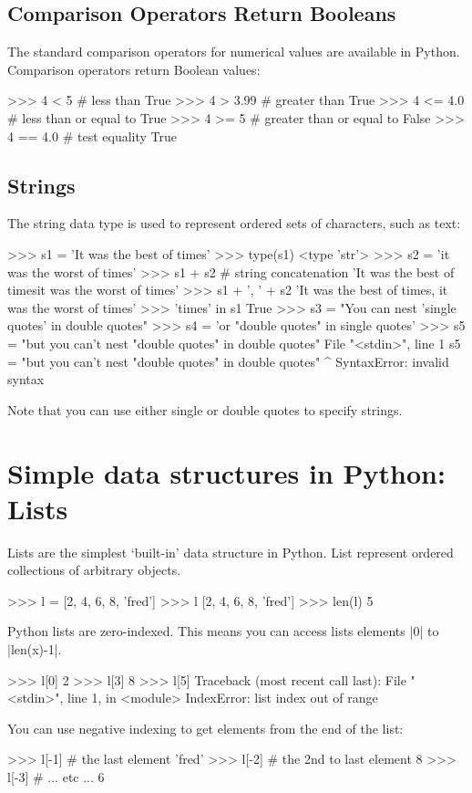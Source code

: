 \subsection{Comparison Operators Return Booleans}

The standard comparison operators for numerical values are available in Python. Comparison operators return Boolean values:
%
\begin{python}
>>> 4 < 5 # less than
True
>>> 4 > 3.99 # greater than
True
>>> 4 <= 4.0 # less than or equal to
True
>>> 4 >= 5 # greater than or equal to
False
>>> 4 == 4.0 # test equality
True
\end{python}


\subsection{Strings}
%
The string data type is used to represent ordered sets of characters, such as text:
%
\begin{python}
>>> s1 = 'It was the best of times'
>>> type(s1)
<type 'str'>
>>> s2 = 'it was the worst of times'
>>> s1 + s2  # string concatenation
'It was the best of timesit was the worst of times'
>>> s1 + ', ' + s2
'It was the best of times, it was the worst of times'
>>> 'times' in s1
True
>>> s3 = "You can nest 'single quotes' in double quotes"
>>> s4 = 'or "double quotes" in single quotes'
>>> s5 = "but you can't nest "double quotes" in double quotes"
  File "<stdin>", line 1
    s5 = "but you can't nest "double quotes" in double quotes"
                                   ^
SyntaxError: invalid syntax
\end{python}
%
Note that you can use either single or double quotes to specify strings.

\section{Simple data structures in Python: Lists}

Lists are the simplest `built-in' data structure in Python. List
represent ordered collections of arbitrary objects.
%
\begin{python}
>>> l = [2, 4, 6, 8, 'fred']
>>> l
[2, 4, 6, 8, 'fred']
>>> len(l)
5
\end{python}

Python lists are zero-indexed. This means you can access lists elements
|0| to |len(x)-1|.
%
\begin{python}
>>> l[0]
2
>>> l[3]
8
>>> l[5]
Traceback (most recent call last):
  File "<stdin>", line 1, in <module>
IndexError: list index out of range
\end{python}
%
You can use negative indexing to get elements from the end of the list:
\begin{python}
>>> l[-1] # the last element
'fred'
>>> l[-2] # the 2nd to last element
8
>>> l[-3] # ... etc ...
6
\end{python}

